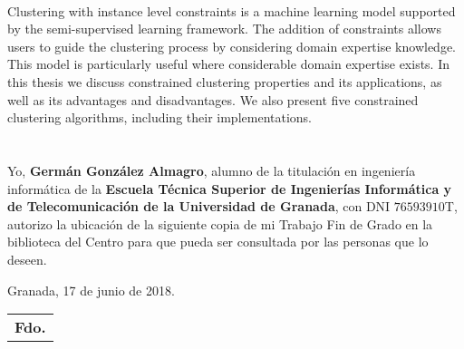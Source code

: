 \vspace{0.7cm}
\\

Clustering with instance level constraints is a machine learning model supported by the semi-supervised learning framework. The addition of constraints allows users to guide the clustering process by considering domain expertise knowledge. This model is particularly useful where considerable domain expertise exists. In this thesis we discuss constrained clustering properties and its applications, as well as its advantages and disadvantages. We also present five constrained clustering  algorithms, including their implementations.

\chapter*{}
\thispagestyle{empty}


Yo, \textbf{Germán González Almagro}, alumno de la titulación en ingeniería informática de la \textbf{Escuela Técnica Superior
de Ingenierías Informática y de Telecomunicación de la Universidad de Granada}, con DNI $\mathrm{76593910}$T, autorizo la
ubicación de la siguiente copia de mi Trabajo Fin de Grado en la biblioteca del Centro para que pueda ser
consultada por las personas que lo deseen.

\vspace{0.1cm}

\begin{flushleft}
	Granada, 17 de junio de 2018.
\end{flushleft}

\vspace{2.5cm}

\begin{flushright}
	
	\begin{tabular}{m{6cm}}
		\\ \hline
		\centering\textbf{Fdo. \myName} \\
	\end{tabular}
	
\end{flushright}


\chapter*{}
\thispagestyle{empty}

